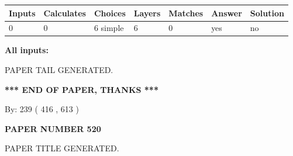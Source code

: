 \documentclass{ctexart}
\begin{document}
 
   
   
   
   
\noindent\begin{tabular}{|l|l|l|l|l|l|l|}
 \hline
Inputs & Calculates & Choices & Layers & Matches & Answer & Solution \\ \hline
 0  & 
 0  & 
 6
  simple  
  & 
 6  & 
 0  & 
  yes & 
  no 
  \\ \hline
 \end{tabular}
   
   
   
   
\noindent{}
   
   
   
   
\noindent\vspace{0.1in}\hspace{-0.08in} {\textbf{\Large{All inputs: }}}
   
   
   
   
   
   
 \vspace{0.2in}
 
   
   
\vspace{2.0in} PAPER TAIL GENERATED.
   
   
   
   
\vspace{1.0in} 
{\textbf{\large{ *** END OF PAPER, THANKS *** }}} 
   
   
\hspace{1.0in} By: 
 239 ( 416 ,  613 )
   
   
   
   
\newpage 
\setcounter{page}{ 
   520001 } 
   
   
   
   
 {\textbf{ \Large{ PAPER NUMBER  520  }}}
   
   
\vspace{0.2in}
   
   
   
   
   
   
   
   
 \vspace{0.2in}
 
 
 
 
   
   
 PAPER TITLE GENERATED.
   
\end{document}
